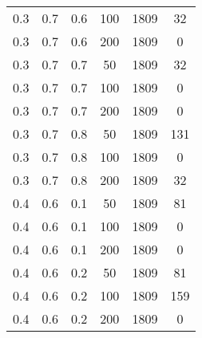 \begin{table}[h]
\begin{center}
\begin{tabular}{|c|c|c|c|c|c|}
		0.3 &  0.7 &  0.6 &  100 &  1809 &    32 \\
		0.3 &  0.7 &  0.6 &  200 &  1809 &     0 \\
	   \hline
		0.3 &  0.7 &  0.7 &   50 &  1809 &    32 \\
		0.3 &  0.7 &  0.7 &  100 &  1809 &     0 \\
		0.3 &  0.7 &  0.7 &  200 &  1809 &     0 \\
	   \hline
		0.3 &  0.7 &  0.8 &   50 &  1809 &   131 \\
		0.3 &  0.7 &  0.8 &  100 &  1809 &     0 \\
		0.3 &  0.7 &  0.8 &  200 &  1809 &    32 \\
	   \hline
		0.4 &  0.6 &  0.1 &   50 &  1809 &    81 \\
		0.4 &  0.6 &  0.1 &  100 &  1809 &     0 \\
		0.4 &  0.6 &  0.1 &  200 &  1809 &     0 \\
	   \hline
		0.4 &  0.6 &  0.2 &   50 &  1809 &    81 \\
		0.4 &  0.6 &  0.2 &  100 &  1809 &   159 \\
		0.4 &  0.6 &  0.2 &  200 &  1809 &     0 \\
	   \hline
        		\end{tabular}
	\end{center}
\end{table}
